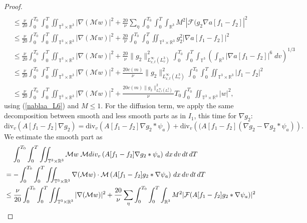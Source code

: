 \documentclass[10pt,a4paper]{amsart}
\newcommand{\R}{\mathbb R}
\newcommand{\T}{\mathbb{T}}
\newcommand{\abs}[1]{\left\vert#1\right\vert}
\newcommand{\dT}{\, {\rm d} T}
\newcommand{\dt}{\, {\rm d} t}
\newcommand{\dv}{\, {\rm d} v}
\newcommand{\dx}{\, {\rm d} x}
\newcommand{\nn}{\nonumber}
\begin{document}
\begin{proof}
\begin{align}
\\
&\leq \frac{\nu}{20}\int_0^{T_0} \int_0^{T} \iint_{\T^3 \times \R^3}  |\nabla(\mathcal{M} w)|^2 %
+ \frac{20}{\nu} \sum_\eta \int_0^{T_0} \int_0^{T} \int_{\R^3}  {M}^2 \abs{\mathcal{F} (g_2 \nabla a[f_1-f_2]}^2 \nn %
\\
&\leq 
\frac{\nu}{20}\int_0^{T_0} \int_0^{T} \iint_{\T^3 \times \R^3}  |\nabla(\mathcal{M} w)|^2 %
+  \frac{20}{\nu}\int_0^{T_0} \int_0^{T} \iint_{\T^3 \times \R^3}   g_2^2 |\nabla a[f_1-f_2]|^2 %
\nonumber 
\\
&\leq \frac{\nu}{20}\int_0^{T_0} \int_0^{T} \iint_{\T^3 \times \R^3}  |\nabla(\mathcal{M} w)|^2 %
+ \frac{20}{\nu}\|g_2\|^2_{L_{x,t}^\infty (L^3_v)}
 \int_0^{T_0} \int_0^{T}\int_{\T^3} \left(  \int_{\mathbb{R}^3 }|\nabla a[f_1-f_2] |^6 \;dv \right)^{1/3} %
\nonumber 
\\
&\leq 
\frac{\nu}{20}\int_0^{T_0} \int_0^{T} \iint_{\T^3 \times \R^3}  |\nabla(\mathcal{M} w)|^2 %
+ \frac{20 c(m)}{\nu}\|g_2\|^2_{L_{x,t}^\infty (L^3_v)} 
 \int_0^{T_0} \int_0^{T}\iint_{\T^3 \times \R^3} |f_1-f_2 |^2 %
 \nonumber 
\\
&\leq 
\frac{\nu}{20} \int_0^{T_0}\int_0^{T} \iint_{\T^3 \times \R^3}  
|\nabla(\mathcal{M} w)|^2 %
+ \frac{20 c(m)  \|g_2\|^2_{L_{x,t}^\infty (L^3_v)}}{\nu}T_0  \int_0^{T_0}\iint_{\T^3 \times \R^3}  | w|^2, \label{I_2_partII} %
\end{align}
using (\ref{nablaa_L6}) and ${M}\le 1$. For the diffusion term, we apply the same decomposition between smooth and less smooth parts as in $I_1$, this time for $\nabla g_2$: 
$$
\textrm{div}_v \left( A[f_1-f_2] \nabla g_2\right) = \textrm{div}_v \left( A[f_1-f_2] \nabla g_2 \ast \psi_a \right) + \textrm{div}_v \left( (A[f_1-f_2] (\nabla g_2 - \nabla g_2 \ast \psi_a )\right).
$$
We estimate the smooth part as 
\begin{align*}
& \quad \,
   \int_0^{T_0} \int_0^{T} \iint_{\T^3 \times \R^3}  \mathcal{M} w \; \mathcal{M} \textrm{div}_v \left( A[f_1-f_2] \nabla g_2 \ast \psi_a \right) \dx\dv\dt\dT  
\\
& = - \int_0^{T_0} \int_0^{T} \iint_{\T^3 \times \R^3}  \nabla(\mathcal{M} w) \cdot  \mathcal{M} \left( A[f_1-f_2] g_2 \ast \nabla \psi_a \right) \dx\dv\dt\dT 
\\
& \leq  
\frac{\nu}{20}\int_0^{T_0} \int_0^{T} \iint_{\T^3 \times \R^3}  |\nabla(\mathcal{M} w)|^2 %
+  \frac{20}{\nu} \sum_\eta \int_0^{T_0} \int_0^{T} \int_{\R^3} M^2 | \mathcal{F}( A[f_1-f_2] g_2 \ast \nabla \psi_a)|^2 

\end{align*}
\end{proof}
\end{document}
